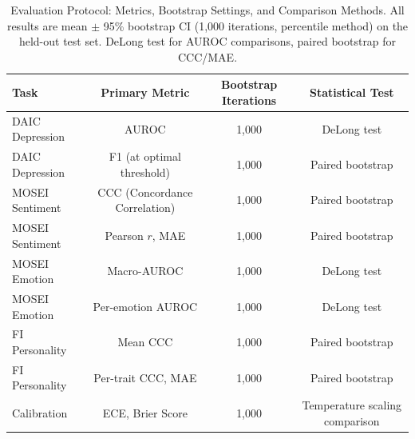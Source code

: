 \begin{table}[htbp]
\centering
\caption{Evaluation Protocol: Metrics, Bootstrap Settings, and Comparison Methods. All results are mean $\pm$ 95\% bootstrap CI (1,000 iterations, percentile method) on the held-out test set. DeLong test for AUROC comparisons, paired bootstrap for CCC/MAE.}
\label{tab:evaluation_protocol}
\begin{tabular}{lccc}
\toprule
Task & Primary Metric & Bootstrap Iterations & Statistical Test \\
\midrule
DAIC Depression & AUROC & 1,000 & DeLong test \\
DAIC Depression & F1 (at optimal threshold) & 1,000 & Paired bootstrap \\
MOSEI Sentiment & CCC (Concordance Correlation) & 1,000 & Paired bootstrap \\
MOSEI Sentiment & Pearson $r$, MAE & 1,000 & Paired bootstrap \\
MOSEI Emotion & Macro-AUROC & 1,000 & DeLong test \\
MOSEI Emotion & Per-emotion AUROC & 1,000 & DeLong test \\
FI Personality & Mean CCC & 1,000 & Paired bootstrap \\
FI Personality & Per-trait CCC, MAE & 1,000 & Paired bootstrap \\
\midrule
Calibration & ECE, Brier Score & 1,000 & Temperature scaling comparison \\
\bottomrule
\end{tabular}
\end{table}